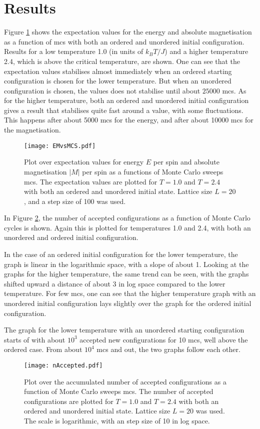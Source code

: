 \section{Results}
\label{sec:results}
Figure \ref{fig:EMvsMCS} shows the expectation values for the energy and absolute magnetisation as a function of mcs with both an ordered and unordered initial configuration. Results for a low temperature 1.0 (in units of $k_BT/J$) and a higher temperature 2.4, which is above the critical temperature, are shown. One can see that the expectation values stabilises almost immediately when an ordered starting configuration is chosen for the lower temperature. But when an unordered configuration is chosen, the values does not stabilise until about $25000$ mcs. As for the higher temperature, both an ordered and unordered initial configuration gives a result that stabilises quite fast around a value, with some fluctuations. This happens after about 5000 mcs for the energy, and after about 10000 mcs for the magnetisation.   
\begin{figure}[htbp]
	\centering
	\texttt{[image: EMvsMCS.pdf]}
	\caption{Plot over expectation values for energy $E$ per spin and absolute magnetisation $|M|$ per spin as a functions of Monte Carlo sweeps mcs. The expectation values are plotted for $T=1.0$ and $T=2.4$ with both an ordered and unordered initial state. Lattice size $L=20$, and a step size of 100 was used.}
	\label{fig:EMvsMCS}
\end{figure}

In Figure \ref{fig:nAccepted}, the number of accepted configurations as a function of Monte Carlo cycles is shown. Again this is plotted for temperatures 1.0 and 2.4, with both an unordered and ordered initial configuration. 

In the case of an ordered initial configuration for the lower temperature, the graph is linear in the logarithmic space, with a slope of about 1. Looking at the graphs for the higher temperature, the same trend can be seen, with the graphs shifted upward a distance of about 3 in log space compared to the lower temperature. For few mcs, one can see that the higher temperature graph with an unordered initial configuration lays slightly over the graph for the ordered initial configuration. 

The graph for the lower temperature with an unordered starting configuration starts of with about $10^3$ accepted new configurations for 10 mcs, well above the ordered case. From about $10^4$ mcs and out, the two graphs follow each other. 
\begin{figure}[htbp]
	\centering
	\texttt{[image: nAccepted.pdf]}
	\caption{Plot over the accumulated number of accepted configurations as a function of Monte Carlo sweeps mcs. The number of accepted configurations are plotted for $T=1.0$ and $T=2.4$ with both an ordered and unordered initial state. Lattice size $L=20$ was used. The scale is logarithmic, with an step size of 10 in log space.}
	\label{fig:nAccepted}
\end{figure}

